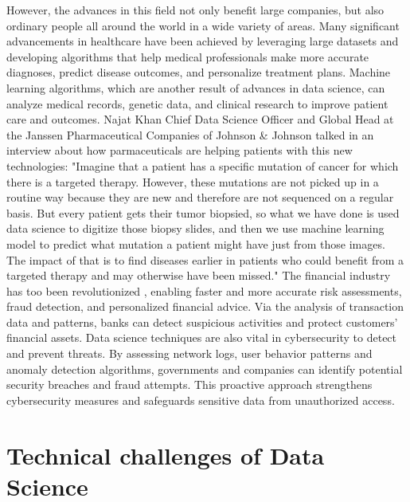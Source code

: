 \documentclass{vgtc}                          %
\begin{document}
However, the advances in this field not only benefit large companies, but also ordinary people all around the world in a wide variety of areas. Many significant advancements in 
healthcare have been achieved by leveraging large datasets and developing algorithms that help medical professionals make more accurate diagnoses, predict disease outcomes, and 
personalize treatment plans. Machine learning algorithms, which are another result of advances in data science, can analyze medical records, genetic data, and clinical research 
to improve patient care and outcomes. Najat Khan Chief Data Science Officer and Global Head at the Janssen Pharmaceutical Companies of Johnson \& Johnson talked in an interview 
about how parmaceuticals are helping patients with this new technologies: "Imagine that a patient has a specific mutation of cancer for which there is a targeted therapy. However, 
these mutations are not picked up in a routine way because they are new and therefore are not sequenced on a regular basis. But every patient gets their tumor biopsied, so what we have 
done is used data science to digitize those biopsy slides, and then we use machine learning model to predict what mutation a patient might have just from those images. The impact of 
that is to find diseases earlier in patients who could benefit from a targeted therapy and may otherwise have been missed."\cite{Robinson:2022} The financial industry has too  been 
revolutionized , enabling faster and more accurate risk assessments, fraud detection, and personalized financial advice. Via the analysis of transaction data and patterns, banks can 
detect suspicious activities and protect customers' financial assets. Data science techniques are also vital in cybersecurity to detect and prevent threats. By assessing network logs, 
user behavior patterns and anomaly detection algorithms, governments and companies can identify potential security breaches and fraud attempts. This proactive approach strengthens 
cybersecurity measures and safeguards sensitive data from unauthorized access.

\section{Technical challenges of Data Science}
\end{document}
